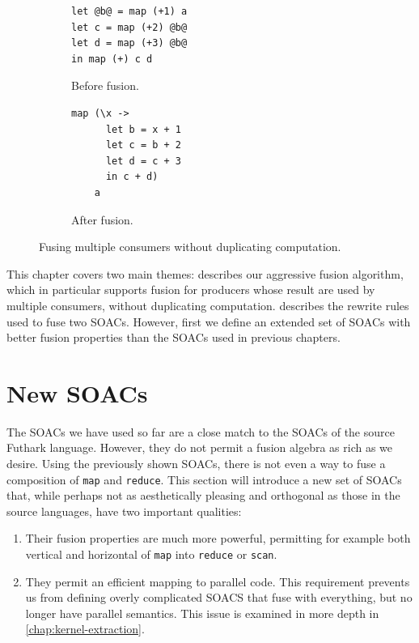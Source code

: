 \begin{figure}
\begin{subfigure}[b]{0.4\textwidth}
\begin{lstlisting}[xleftmargin=0pt]
let @b@ = map (+1) a
let c = map (+2) @b@
let d = map (+3) @b@
in map (+) c d
\end{lstlisting}
\caption{Before fusion.}
\end{subfigure}%
\hspace{.1\textwidth}
\begin{subfigure}[b]{0.4\textwidth}
\begin{lstlisting}[xleftmargin=0pt]
map (\x ->
      let b = x + 1
      let c = b + 2
      let d = c + 3
      in c + d)
    a
\end{lstlisting}
\caption{After fusion.}
\end{subfigure}%
\caption{Fusing multiple consumers without duplicating computation.}
\label{fig:fusion-multiple-consumers}
\end{figure}

This chapter covers two main themes: 
describes our aggressive fusion algorithm, which in particular
supports fusion for producers whose result are used by multiple
consumers, without duplicating computation.  
describes the rewrite rules used to fuse two SOACs.  However, first we
define an extended set of SOACs with better fusion properties than the
SOACs used in previous chapters.

\section{New SOACs}
\label{sec:fusion-in-futhark}

The SOACs we have used so far are a close match to the SOACs of the
source Futhark language.  However, they do not permit a fusion algebra
as rich as we desire.  Using the previously shown SOACs, there is not
even a way to fuse a composition of \lstinline{map} and
\lstinline{reduce}.  This section will introduce a new set of SOACs
that, while perhaps not as aesthetically pleasing and orthogonal as
those in the source languages, have two important qualities:

\begin{enumerate}
\item Their fusion properties are much more powerful, permitting for
  example both vertical and horizontal of \lstinline{map} into
  \lstinline{reduce} or \lstinline{scan}.
\item They permit an efficient mapping to parallel code.  This
  requirement prevents us from defining overly complicated SOACS that
  fuse with everything, but no longer have parallel semantics.  This
  issue is examined in more depth in \cref{chap:kernel-extraction}.
\end{enumerate}

